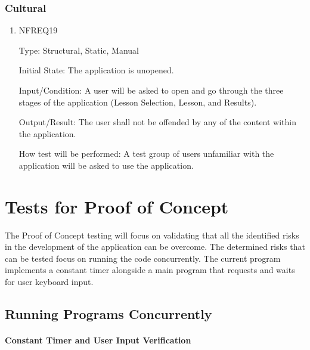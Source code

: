 \documentclass[12pt, titlepage]{article}
\begin{document}
\subsubsection{Cultural}
\begin{enumerate}

\item{NFREQ19\\}

Type: Structural, Static, Manual
					
Initial State: The application is unopened.
					
Input/Condition: A user will be asked to open and go through the three stages of the application (Lesson Selection, Lesson, and Results).
					
Output/Result: The user shall not be offended by any of the content within the application.
					
How test will be performed: A test group of users unfamiliar with the application will be asked to use the application. 
\end{enumerate}

\section{Tests for Proof of Concept}

The Proof of Concept testing will focus on validating that all the identified risks in the development of the application can be overcome. The determined risks that can be tested focus on running the code concurrently. The current program implements a constant timer alongside a main program that requests and waits for user keyboard input. 

\subsection{Running Programs Concurrently}
		
\paragraph{Constant Timer and User Input Verification}
\end{document}
